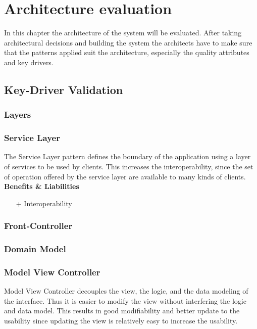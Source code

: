 
\newcommand{\bo}[1]{\textbf{#1}}

\chapter{Architecture evaluation}
\label{ch:evaluation}

In this chapter the architecture of the system will be evaluated. After taking architectural decisions and building the system the architects have to make sure that the patterns applied suit the architecture, especially the quality attributes and key drivers.%

\section{Key-Driver Validation}

\subsection*{Layers}
\subsection*{Service Layer}
The Service Layer pattern defines the boundary of the application using a layer of services to be used by clients. This increases the interoperability, since the set of operation offered by the service layer are available to many kinds of clients. \\
\textbf{Benefits \& Liabilities} ~
\begin{itemize}
\item[+] Interoperability 
\end{itemize}

\subsection*{Front-Controller}
\subsection*{Domain Model}
\subsection*{Model View Controller}
Model View Controller decouples the view, the logic, and the data modeling of the interface. Thus it is easier to modify the view without interfering the logic and data model. This results in good modifiability and better update to the usability since updating the view is relatively easy to increase the usability.

